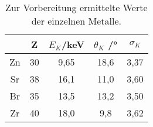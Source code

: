 \begin{table}[H]
  \centering
   \begin{tabular}{c c c c c}
    \toprule
     & Z & $E_{K}$/\;keV & $\theta_{K}$ /\;° & $\sigma_{K}$ \\
    \midrule
    Zn & 30 & 9,65 & 18,6 & 3,37\\
    Sr & 38 & 16,1 & 11,0 & 3,60\\
    Br & 35 & 13,5 & 13,2 & 3,50\\
    Zr & 40 & 18,0 & 9,8 & 3,62 \\
    \bottomrule
  \end{tabular}
  \caption{Zur Vorbereitung ermittelte Werte der einzelnen Metalle.}
  \label{tab:tabvor}
  \cite{alle}
\end{table}

